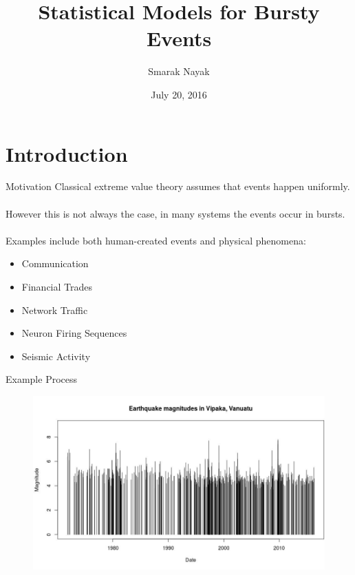 \documentclass{beamer}
\title{Statistical Models for Bursty Events}
\author{Smarak Nayak}
\date{July 20, 2016}
\begin{document}
 
\frame{\titlepage}
\section{Introduction}

\begin{frame}{Motivation}
	Classical extreme value theory assumes that events happen uniformly. \\~\\
	
	However this is not always the case, in many systems the events occur in bursts. \\~\\
	
	Examples include both human-created events and physical phenomena:
		\begin{itemize}
		\item Communication
		\item Financial Trades 
		\item Network Traffic
		\item Neuron Firing Sequences
		\item Seismic Activity
	    \end{itemize}
	
\end{frame}

\begin{frame}{Example Process }
    \begin{figure}
        \hspace{-0.5cm}
        \includegraphics[scale=0.45]{EarthQuakeData.jpeg}
    \end{figure}

\end{frame}
\end{document}
